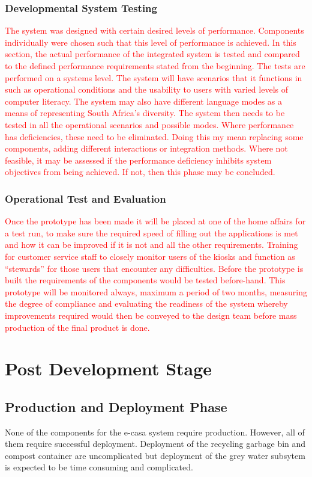 \documentclass[a4paper,11pt,fleqn]{report}
\begin{document}
\subsection{Developmental System Testing}
\textcolor{red}{The system was designed with certain desired levels of performance. Components individually were chosen such that this level of performance is achieved. In this section, the actual performance of the integrated system is tested and compared to the defined performance requirements stated from the beginning. The tests are performed on a systems level. The system will have scenarios that it functions in such as operational conditions and the usability to users with varied levels of computer literacy. The system may also have different language modes as a means of representing South Africa’s diversity. The system then needs to be tested in all the operational scenarios and possible modes. Where performance has deficiencies, these need to be eliminated. Doing this my mean replacing some components, adding different interactions or integration methods. Where not feasible, it may be assessed if the performance deficiency inhibits system objectives from being achieved. If not, then this phase may be concluded.}

\subsection{Operational Test and Evaluation}
\textcolor{red}{Once the prototype has been made it will be placed at one of the home affairs for a test run, to make sure the required speed of filling out the applications is met and how it can be improved if it is not and all the other requirements. Training for customer service staff to closely monitor users of the kiosks and function as “stewards” for those users that encounter any difficulties. Before the prototype is built the requirements of the components would be tested before-hand. This prototype will be monitored always, maximum a period of two months, measuring the degree of compliance and evaluating the readiness of the system whereby improvements required would then be conveyed to the design team before mass production of the final product is done.}

\chapter{Post Development Stage}

\section{Production and Deployment Phase}
None of the components for the \ac{e-casa} system require production. However, all of them require successful deployment. Deployment of the recycling garbage bin and compost container are uncomplicated but deployment of the grey water subsytem is expected to be time consuming and complicated. 
\end{document}
